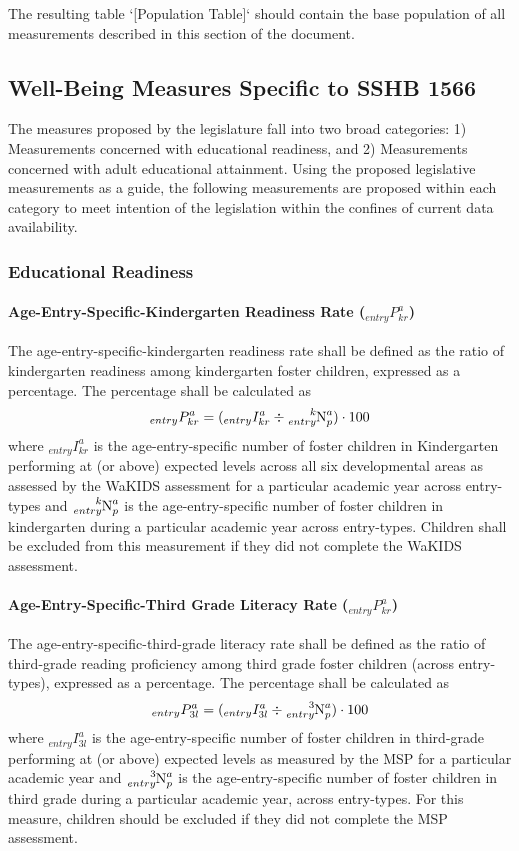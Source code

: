 \documentclass[12pt]{article}\usepackage[]{graphicx}\usepackage[]{color}
\begin{document}
The resulting table `[Population Table]` should contain the base population of all measurements described in this section of the document. 


\subsection{Well-Being Measures Specific to SSHB 1566}

The measures proposed by the legislature fall into two broad categories: 1) Measurements concerned with educational readiness, and 2) Measurements concerned with adult educational attainment. Using the proposed legislative measurements as a guide, the following measurements are proposed within each category to meet intention of the legislation within the confines of current data availability. 

\subsubsection{Educational Readiness}

\paragraph{Age-Entry-Specific-Kindergarten Readiness Rate (${}_{entry}P_{kr}^a$)}

The age-entry-specific-kindergarten readiness rate shall be defined as the ratio of kindergarten readiness among kindergarten foster children, expressed as a percentage. The percentage shall be calculated as 
$$
{}_{entry}P_{kr}^a = ({}_{entry}I_{kr}^a \div \ce{_{$entry$}^{$k$}N^{$a$}_{$p$}}) \cdot 100
$$
where ${}_{entry}I_{kr}^a$ is the age-entry-specific number of foster children in Kindergarten performing at (or above) expected levels across all six developmental areas as assessed by the WaKIDS assessment for a particular academic year across entry-types and $\ce{_{$entry$}^{$k$}N^{$a$}_{$p$}}$ is the age-entry-specific number of foster children in kindergarten during a particular academic year across entry-types. Children shall be excluded from this measurement if they did not complete the WaKIDS assessment. 

\paragraph{Age-Entry-Specific-Third Grade Literacy Rate (${}_{entry}P_{kr}^a$)}

The age-entry-specific-third-grade literacy rate shall be defined as the ratio of third-grade reading proficiency among third grade foster children (across entry-types), expressed as a percentage. The percentage shall be calculated as 
$$
{}_{entry}P_{3l}^a = ({}_{entry}I_{3l}^a \div \ce{_{$entry$}^{$3$}N^{$a$}_{$p$}}) \cdot 100
$$
where ${}_{entry}I_{3l}^a$ is the age-entry-specific number of foster children in third-grade performing at (or above) expected levels as measured by the MSP for a particular academic year and $\ce{_{$entry$}^{$3$}N^{$a$}_{$p$}}$ is the age-entry-specific number of foster children in third grade during a particular academic year, across entry-types. For this measure, children should be excluded if they did not complete the MSP assessment. 
\end{document}
